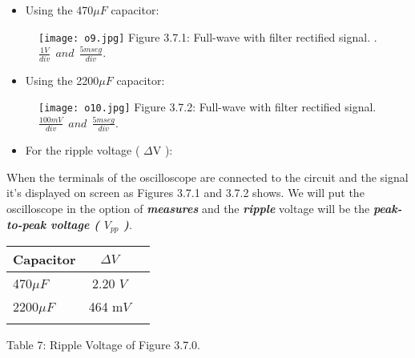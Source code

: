 \begin{multicols}{2}
\begin{itemize}
\item Using the 470$\mu F$ capacitor:
\end{itemize}

\begin{figure}[H]
\texttt{[image: o9.jpg]}
\centering \linebreak \linebreak Figure 3.7.1: Full-wave with filter rectified signal.
\linebreak .\linebreak $\frac{1 V}{div}\ \ and\ \ \frac{5 mseg}{div}$.
\end{figure}

\begin{itemize}
\item Using the 2200$\mu F$ capacitor:
\end{itemize}

\begin{figure}[H]
\texttt{[image: o10.jpg]}
\centering \linebreak \linebreak Figure 3.7.2: Full-wave with filter rectified signal.
\linebreak \linebreak $\frac{100 mV}{div}\ \ and\ \ \frac{5 mseg}{div}$.
\end{figure}
\end{multicols}

{\bfseries\itshape
\begin{itemize}
\item For the ripple voltage ( $\Delta$V ):
\end{itemize}}

When the terminals of the oscilloscope are connected to the circuit and the signal it's displayed on screen as Figures 3.7.1 and 3.7.2 shows. We will put the oscilloscope in the option of {\bfseries\itshape measures} and the {\bfseries\itshape ripple} voltage will be the {\bfseries\itshape peak-to-peak voltage ( $V_{pp}$ )}. \hfill \break

\begin{center}
\begin{tabular}[.5cm]{l c c }
\toprule
Capacitor & $\Delta V$  \\
\midrule
470$\mu F$ & 2.20 $V$ \\
\cmidrule{1-2}
2200$\mu F$ & 464 m$V$ \\
\bottomrule
\linebreak
\end{tabular}
\centering \linebreak Table 7: Ripple Voltage of Figure 3.7.0.
\end{center} 

\pagebreak